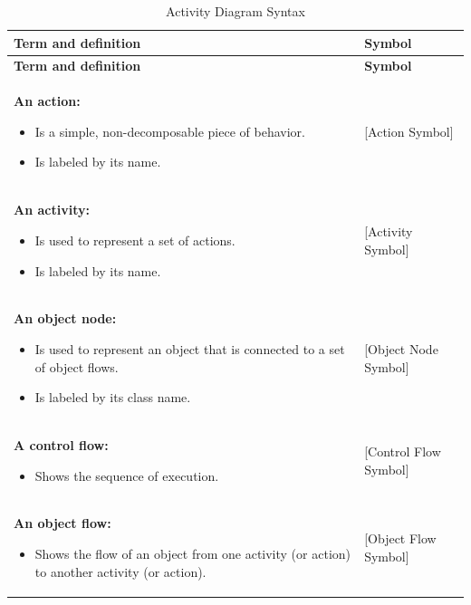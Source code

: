 \documentclass[12pt,a4paper]{report}
\begin{document}
\begin{longtable}{|p{8cm}|p{4cm}|}
\caption{Activity Diagram Syntax} \label{tab:activity} \\
\hline
\textbf{Term and definition} & \textbf{Symbol} \\
\hline
\endfirsthead
\hline
\textbf{Term and definition} & \textbf{Symbol} \\
\hline
\endhead

\textbf{An action:} \newline
\begin{itemize}
    \item Is a simple, non-decomposable piece of behavior.
    \item Is labeled by its name.
\end{itemize} & [Action Symbol] \\
\hline

\textbf{An activity:} \newline
\begin{itemize}
    \item Is used to represent a set of actions.
    \item Is labeled by its name.
\end{itemize} & [Activity Symbol] \\
\hline

\textbf{An object node:} \newline
\begin{itemize}
    \item Is used to represent an object that is connected to a set of object flows.
    \item Is labeled by its class name.
\end{itemize} & [Object Node Symbol] \\
\hline

\textbf{A control flow:} \newline
\begin{itemize}
    \item Shows the sequence of execution.
\end{itemize} & [Control Flow Symbol] \\
\hline

\textbf{An object flow:} \newline
\begin{itemize}
    \item Shows the flow of an object from one activity (or action) to another activity (or action).
\end{itemize} & [Object Flow Symbol] \\
\hline


\end{longtable}
\end{document}
